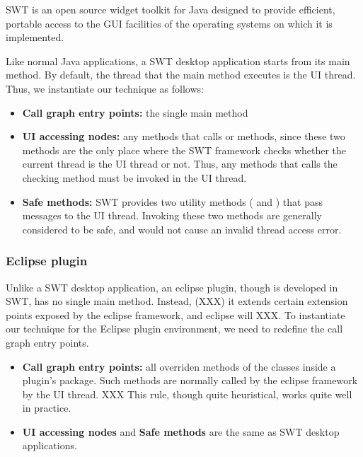 SWT is an open source widget toolkit for Java designed to provide efficient,
portable access to the GUI facilities of the operating systems on which it is implemented.

Like normal Java applications, a SWT desktop application starts from its main method.
By default, the thread that the main method executes is the UI thread. Thus, we instantiate
our technique as follows:

\begin{itemize}

\item \textbf{Call graph entry points: } the single main method

\item \textbf{UI accessing nodes: } any methods that calls 
or  methods, since these two methods are the
only place where the SWT framework checks whether the current thread is the UI thread or not. Thus, any
methods that calls the checking method must be invoked in the UI thread.

\item \textbf{Safe methods: } SWT provides two utility methods (
and ) that pass messages to the UI thread.
 Invoking these two methods are generally considered to be safe, and would not
cause an invalid thread access error.

\end{itemize}

\subsubsection{Eclipse plugin}

Unlike a SWT desktop application, an eclipse plugin, though is developed in SWT,
has no single main method. Instead, (XXX) it extends certain extension points
exposed by the eclipse framework, and eclipse will XXX. To instantiate our
technique for the Eclipse plugin environment, we need to redefine the
call graph entry points.

\begin{itemize}

\item \textbf{Call graph entry points: } all overriden methods of the classes inside
 a plugin's  package.  Such methods are normally called by the eclipse framework
by the UI thread. XXX This rule, though quite heuristical, works quite well in practice.

\item \textbf{UI accessing nodes} and \textbf{Safe methods} are the same as SWT desktop applications.

\end{itemize}

